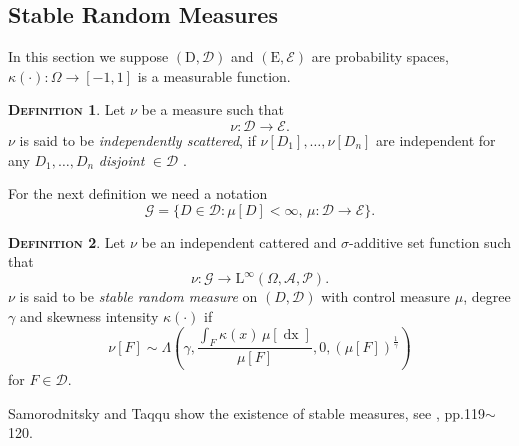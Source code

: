 \documentclass[a4paper, twoside, 11pt]{article}
\theoremstyle{definition}
\newtheorem{definition}{\scshape Definition}[section]
\newcommand{\brkt}[1]{\left({#1} \right)}
\begin{document}
\subsection{Stable Random Measures}
In this section we suppose $(\mathrm{D}, \mathscr{D})$ and $(\mathrm{E}, \mathscr{E})$ are probability spaces, $\kappa(\cdot) : \Omega \rightarrow [-1, 1]$ is a measurable function.
\begin{definition}
	Let $\nu$ be a measure such that
	\begin{equation}
	  \nu : \mathscr{D} \rightarrow \mathscr{E}.\nonumber
	\end{equation}
	$\nu$ is said to be \emph{independently scattered}, if $\nu[D_1], \dots, \nu[D_n]$ are independent for any $D_1,\dots, D_n$ \emph{disjoint} $\in \mathscr{D}$ .
\end{definition}

For the next definition we need a notation
\begin{equation}
  \mathscr{G} = \{D \in \mathscr{D} : \mu[D] < \infty,\, \mu : \mathscr{D} \rightarrow \mathscr{E}\}.
\end{equation}
\begin{definition}
  Let $\nu$ be an independent cattered and $\sigma$-additive set function such that
\begin{equation*}
  \nu: \mathscr{G}  \rightarrow \mathrm{L}^{\infty}(\Omega, \mathscr{A}, \mathcal{P}). 
\end{equation*}
$\nu$ is said to be \emph{stable random measure} on $(D, \mathscr{D})$ with control measure $\mu$, degree $\gamma$ and skewness intensity $\kappa(\cdot)$ if 
\begin{equation}
  \nu[F] \sim \Lambda\brkt{\gamma, \frac{\int_F \kappa(x)\, \mu[\mathop{dx}]}{\mu[F]}, 0, (\mu[F])^{\frac{1}{\gamma}}}
\end{equation}
for $F \in \mathscr{D}$.
\end{definition}
Samorodnitsky and Taqqu show the existence of stable measures, see \cite{samorodnitsky}, pp.119$\sim$120.
\end{document}
